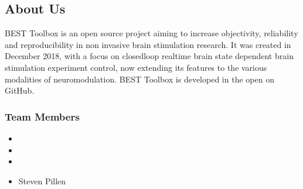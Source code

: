 \documentclass[letterpaper,10pt,english]{sphinxmanual}
\begin{document}
\subsection{About Us}
\label{\detokenize{17_About Us:about-us}}\label{\detokenize{17_About Us::doc}}
\sphinxAtStartPar
BEST Toolbox is an open source project aiming to increase objectivity, reliability and reproducibility in non invasive brain stimulation research. It was created in December 2018, with a focus on closed\sphinxhyphen{}loop real\sphinxhyphen{}time brain state dependent brain stimulation experiment control, now extending its features to the various modalities of neuromodulation. BEST Toolbox is developed in the open on GitHub.


\subsubsection{Team Members}
\label{\detokenize{17_About Us:team-members}}\begin{itemize}
\item {} 
\sphinxAtStartPar
{}

\item {} 
\sphinxAtStartPar
{}

\item {} 
\sphinxAtStartPar
{}

\item {} 
\sphinxAtStartPar
Steven Pillen

\end{itemize}



\renewcommand{\indexname}{Index}
\printindex
\end{document}
